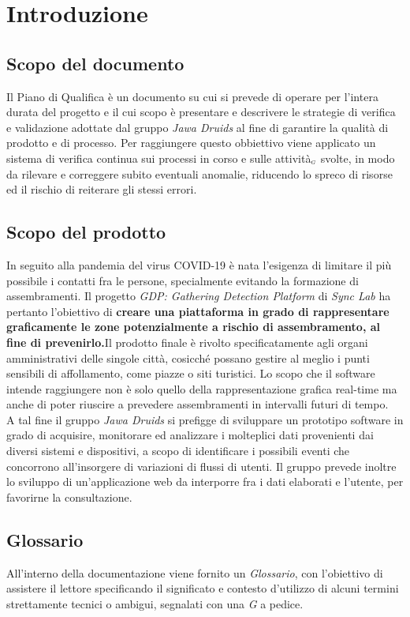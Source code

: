 \chapter{Introduzione}\label{Introduzione}

\section{Scopo del documento}\label{IntroduzioneScopoDelDocumento}
Il Piano di Qualifica è un documento su cui si prevede di operare per l’intera durata del progetto 
e il cui scopo è presentare e descrivere le strategie di verifica e validazione adottate 
dal gruppo \textit{Jawa Druids} al fine di garantire la qualità di prodotto e di processo.  
Per raggiungere questo obbiettivo viene applicato un sistema di verifica continua sui processi in corso e 
sulle attività$_{\scaleto{G}{3pt}}$ svolte, in modo da rilevare e correggere subito eventuali anomalie, riducendo lo spreco di risorse 
ed il rischio di reiterare gli stessi errori.
\section{Scopo del prodotto}\label{IntroduzioneScopodelProdotto}
In seguito alla pandemia del virus COVID-19 è nata l'esigenza di limitare il più possibile i
contatti fra le persone, specialmente evitando la formazione di assembramenti. 
Il progetto \textit{GDP: Gathering Detection Platform} di \textit{Sync Lab} ha pertanto l'obiettivo di \textbf{creare una piattaforma in grado di rappresentare graficamente le zone potenzialmente a rischio di assembramento, al fine di prevenirlo.}Il prodotto finale è rivolto specificatamente agli
organi amministrativi delle singole città, cosicché possano gestire al meglio i punti sensibili di
affollamento, come piazze o siti turistici. Lo scopo che il software intende raggiungere non è
solo quello della rappresentazione grafica real-time ma anche di poter riuscire a prevedere
assembramenti in intervalli futuri di tempo.
\\
A tal fine il gruppo \textit{Jawa Druids} si prefigge di sviluppare un prototipo software in grado di acquisire, monitorare ed analizzare i molteplici dati provenienti dai diversi sistemi e dispositivi, a scopo di identificare i possibili eventi che concorrono all'insorgere di variazioni di flussi di utenti. Il gruppo prevede inoltre lo sviluppo di un'applicazione web da interporre fra i dati elaborati e l'utente, per favorirne la consultazione.
\section{Glossario}\label{IntroduzioneGlossario}
All'interno della documentazione viene fornito un \textit{Glossario}, con l'obiettivo di assistere il lettore specificando il significato e contesto d'utilizzo di alcuni termini strettamente tecnici o ambigui, segnalati con una \textit{G} a pedice.
